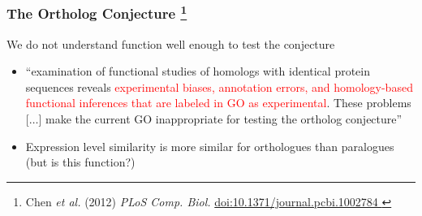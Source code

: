 %
\begin{frame}
  \frametitle{The Ortholog Conjecture
    \footnote{\tiny{Chen \textit{et al.} (2012) \textit{PLoS Comp. Biol.} \href{http://dx.doi.org/10.1371/journal.pcbi.1002784}{doi:10.1371/journal.pcbi.1002784
    }}}  
  }
  \textcolor{hutton_green}{We do not understand function well enough to test the conjecture}
  \begin{itemize}
    \item ``examination of functional studies of homologs with identical protein sequences reveals \textcolor{red}{experimental biases, annotation errors, and homology-based functional inferences that are labeled in GO as experimental}. These problems [$\ldots$] make the current GO inappropriate for testing the ortholog conjecture''
    \item Expression level similarity is more similar for orthologues than paralogues \\
    \textcolor{hutton_blue}{(but is this function?)}
  \end{itemize}
\end{frame}